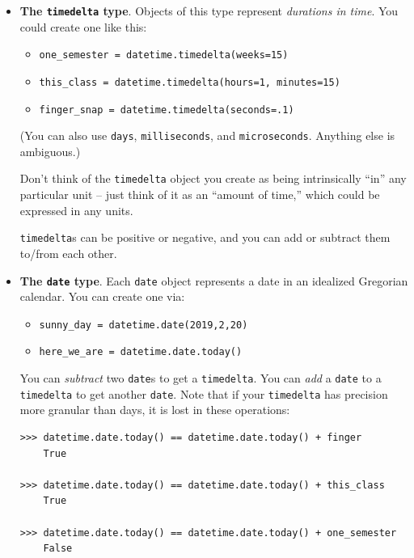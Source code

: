 \begin{itemize}
\itemsep1em

\item \textbf{The \texttt{timedelta} type}. Objects of this type represent
\textit{durations in time}. You could create one like this:
    \begin{itemize}
    \itemsep.1em
    \item \texttt{one\_semester = datetime.timedelta(weeks=15)}
    \item \texttt{this\_class = datetime.timedelta(hours=1, minutes=15)}
    \item \texttt{finger\_snap = datetime.timedelta(seconds=.1)}
    \end{itemize}

    (You can also use \texttt{days}, \texttt{milliseconds}, and
\texttt{microseconds}. Anything else is ambiguous.)

    Don't think of the \texttt{timedelta} object you create as being
intrinsically ``in'' any particular unit -- just think of it as an ``amount of
time,'' which could be expressed in any units.

    \texttt{timedelta}s can be positive or negative, and you can add or
subtract them to/from each other.

\item \textbf{The \texttt{date} type}. Each \texttt{date} object represents a
date in an idealized Gregorian calendar. You can create one via:
    \begin{itemize}
    \itemsep.1em
    \item \texttt{sunny\_day = datetime.date(2019,2,20)}
    \item \texttt{here\_we\_are = datetime.date.today()}
    \end{itemize}

    You can \textit{subtract} two \texttt{date}s to get a \texttt{timedelta}.
You can \textit{add} a \texttt{date} to a \texttt{timedelta} to get another
\texttt{date}. Note that if your \texttt{timedelta} has precision more
granular than days, it is lost in these operations:

\begin{Verbatim}[fontsize=\small,samepage=true,frame=single]
>>> datetime.date.today() == datetime.date.today() + finger
    True

>>> datetime.date.today() == datetime.date.today() + this_class
    True

>>> datetime.date.today() == datetime.date.today() + one_semester
    False
\end{Verbatim}
\normalsize


\end{itemize}
